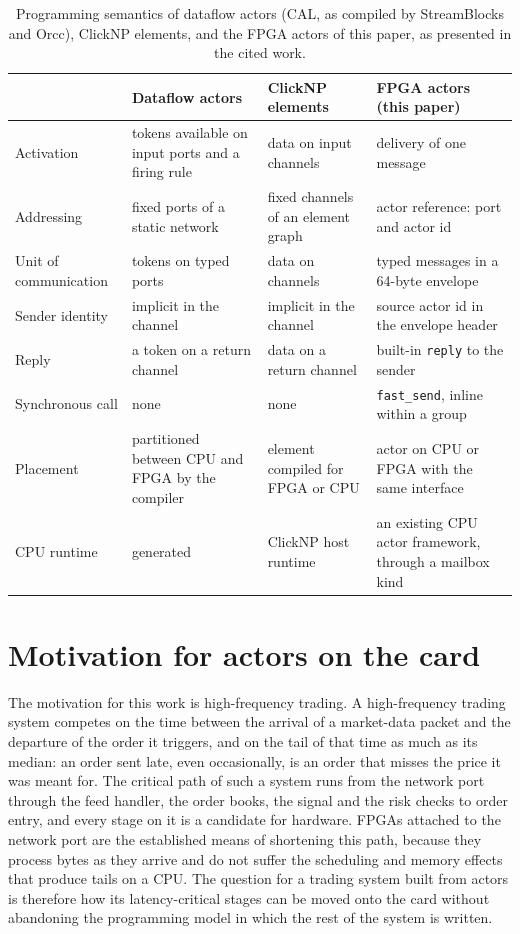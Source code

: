 \documentclass[11pt]{article}
\newcommand{\fs}{\texttt{fast\_send}}
\begin{document}
\begin{table}[htbp]
\centering
\caption{Programming semantics of dataflow actors (CAL, as compiled by
StreamBlocks and Orcc), ClickNP elements, and the FPGA actors of this paper,
as presented in the cited work.}
\label{tab:actorcmp}
\small
\begin{tabular}{p{2.6cm} p{3.5cm} p{3.5cm} p{4.4cm}}
\toprule
& Dataflow actors \cite{cal2003,streamblocks2020} & ClickNP elements \cite{clicknp2016} & FPGA actors (this paper) \\
\midrule
Activation & tokens available on input ports and a firing rule & data on input channels & delivery of one message \\
Addressing & fixed ports of a static network & fixed channels of an element graph & actor reference: port and actor id \\
Unit of communication & tokens on typed ports & data on channels & typed messages in a 64-byte envelope \\
Sender identity & implicit in the channel & implicit in the channel & source actor id in the envelope header \\
Reply & a token on a return channel & data on a return channel & built-in \texttt{reply} to the sender \\
Synchronous call & none & none & \fs{}, inline within a group \\
Placement & partitioned between CPU and FPGA by the compiler & element compiled for FPGA or CPU & actor on CPU or FPGA with the same interface \\
CPU runtime & generated & ClickNP host runtime & an existing CPU actor framework, through a mailbox kind \\
\bottomrule
\end{tabular}
\end{table}

\section{Motivation for actors on the card}
\label{sec:why}

The motivation for this work is high-frequency trading. A high-frequency trading
system competes on the time between the arrival of a market-data packet and the
departure of the order it triggers, and on the tail of that time as much as its
median: an order sent late, even occasionally, is an order that misses the price
it was meant for. The critical path of such a system runs from the network port
through the feed handler, the order books, the signal and the risk checks to
order entry, and every stage on it is a candidate for hardware. FPGAs attached to
the network port are the established means of shortening this path, because they
process bytes as they arrive and do not suffer the scheduling and memory effects
that produce tails on a CPU. The question for a trading system built from actors
is therefore how its latency-critical stages can be moved onto the card without
abandoning the programming model in which the rest of the system is written.
\end{document}
